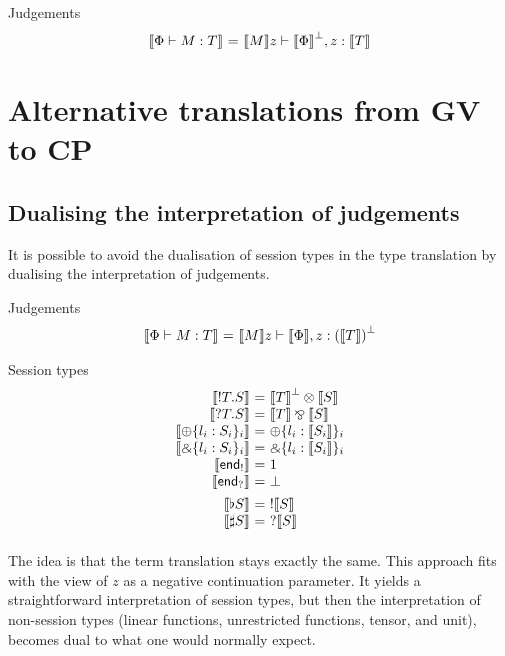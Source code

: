 \documentclass{easychair}
\makeatletter
\newcommand{\ba}{\begin{array}}
\newcommand{\ea}{\end{array}}
\newenvironment{equations}{\[\ba{@{}r@{~}c@{~}l@{}}}{\ea\]}
\newcommand{\key}{\mathsf}
\newcommand{\set}[1]{\{ #1 \}}
\newcommand{\gvtocp}[1]{\llbracket{#1}\rrbracket}
\newcommand{\row}[2]{\set{#1}_{#2}}
\newcommand{\gvOutput}[2]{\mathord{!}{#1}.{#2}}
\newcommand{\gvInput}[2]{\mathord{?}{#1}.{#2}}
\newcommand{\gvEndOutput}{\key{end}_!}
\newcommand{\gvEndInput}{\key{end}_?}
\newcommand{\gvPlus}[2]{\oplus \row{#1}{#2}}
\newcommand{\gvChoice}[2]{\binampersand \row{#1}{#2}}
\newcommand{\gvServer}[1]{\flat {#1}}
\newcommand{\gvService}[1]{\sharp {#1}}
\newcommand{\cpj}[2]{{#1} \vdash {#2}}
\newcommand{\gvj}[3]{{#1} \vdash {#2} : {#3}}
\newcommand{\la}{l}
\newcommand{\cpTimes}[2]{{#1} \otimes {#2}}
\newcommand{\cpPar}[2]{{#1} \mathbin{\bindnasrepma} {#2}}
\newcommand{\cpPlus}[2]{\oplus \row{#1}{#2}}
\newcommand{\cpWith}[2]{\binampersand \row{#1}{#2}}
\newcommand{\cpOne}{1}
\newcommand{\cpBottom}{\bot}
\newcommand{\cpOfCourse}[1]{!{#1}}
\newcommand{\cpWhyNot}[1]{?{#1}}
\newcommand{\cpDual}[1]{{#1}^\bot}
\newcommand{\gvtocps}[1]{\gvtocp{#1}}
\makeatother
\begin{document}
Judgements
\begin{equations}
\gvtocp{\gvj{\Phi}{M}{T}} &=& \cpj{\gvtocp{M}z}{\cpDual{\gvtocp{\Phi}}, z:\gvtocp{T}}
\end{equations}





\section{Alternative translations from GV to CP}

\subsection{Dualising the interpretation of judgements}

It is possible to avoid the dualisation of session types in the type
translation by dualising the interpretation of judgements.

Judgements
\begin{equations}
\gvtocps{\gvj{\Phi}{M}{T}} &=& \cpj{\gvtocp{M} z}{\gvtocps{\Phi}, z:\cpDual{(\gvtocps{T})}}
\end{equations}

Session types
\begin{equations}
\gvtocps{\gvOutput{T}{S}}        &=& \cpTimes{\cpDual{\gvtocps{T}}}{\gvtocps{S}} \\
\gvtocps{\gvInput{T}{S}}         &=& \cpPar{\gvtocps{T}}{\gvtocps{S}} \\
\gvtocps{\gvPlus{\la_i:S_i}{i}}   &=& \cpPlus{\la_i:\gvtocps{S_i}}{i} \\
\gvtocps{\gvChoice{\la_i:S_i}{i}} &=& \cpWith{\la_i:\gvtocps{S_i}}{i} \\
\gvtocps{\gvEndOutput}              &=& \cpOne \\
\gvtocps{\gvEndInput}               &=& \cpBottom \\[1ex]

\gvtocps{\gvServer{S}}  &=& \cpOfCourse{\gvtocps{S}} \\
\gvtocps{\gvService{S}} &=& \cpWhyNot{\gvtocps{S}} \\[1ex]
\end{equations}


The idea is that the term translation stays exactly the same. This
approach fits with the view of $z$ as a negative continuation
parameter. It yields a straightforward interpretation of session
types, but then the interpretation of non-session types (linear
functions, unrestricted functions, tensor, and unit), becomes dual to
what one would normally expect.
\end{document}
